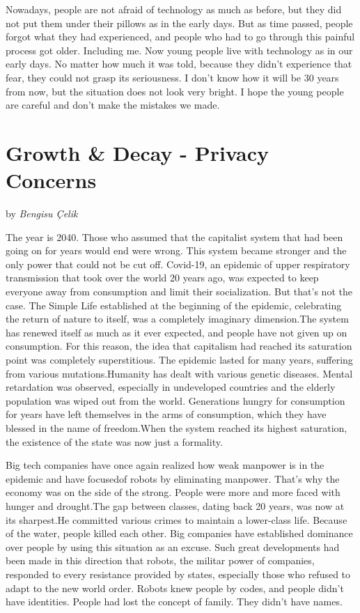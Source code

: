 \documentclass[]{book}
\begin{document}
Nowadays, people are not afraid of technology as much as before, but they did not put them under their pillows as in the early days. But as time passed, people forgot what they had experienced, and people who had to go through this painful process got older. Including me. Now young people live with technology as in our early days. No matter how much it was told, because they didn't experience that fear, they could not grasp its seriousness. I don't know how it will be 30 years from now, but the situation does not look very bright. I hope the young people are careful and don't make the mistakes we made.

\hypertarget{growth-decay---privacy-concerns}{%
\chapter{Growth \& Decay - Privacy Concerns}\label{growth-decay---privacy-concerns}}

by \emph{Bengisu Çelik}

The year is 2040. Those who assumed that the capitalist system that had been going on for years would end were wrong. This system became stronger and the only power that could not be cut off. Covid-19, an epidemic of upper respiratory transmission that took over the world 20 years ago, was expected to keep everyone away from consumption and limit their socialization. But that's not the case. The Simple Life established at the beginning of the epidemic, celebrating the return of nature to itself, was a completely imaginary dimension.The system has renewed itself as much as it ever expected, and people have not given up on consumption. For this reason, the idea that capitalism had reached its saturation point was completely superstitious. The epidemic lasted for many years, suffering from various mutations.Humanity has dealt with various genetic diseases. Mental retardation was observed, especially in undeveloped countries and the elderly population was wiped out from the world. Generations hungry for consumption for years have left themselves in the arms of consumption, which they have blessed in the name of freedom.When the system reached its highest saturation, the existence of the state was now just a formality.

Big tech companies have once again realized how weak manpower is in the epidemic and have focusedof robots by eliminating manpower. That's why the economy was on the side of the strong. People were more and more faced with hunger and drought.The gap between classes, dating back 20 years, was now at its sharpest.He committed various crimes to maintain a lower-class life. Because of the water, people killed each other. Big companies have established dominance over people by using this situation as an excuse. Such great developments had been made in this direction that robots, the militar power of companies, responded to every resistance provided by states, especially those who refused to adapt to the new world order. Robots knew people by codes, and people didn't have identities. People had lost the concept of family. They didn't have names.
\end{document}
